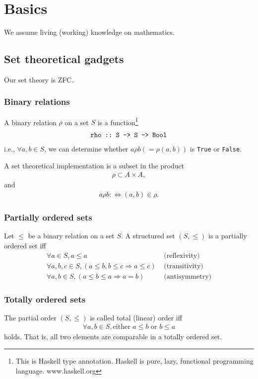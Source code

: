 \documentclass[11pt]{book}
\begin{document}
\chapter{Basics}
We assume living (working) knowledge on mathematics.

\section{Set theoretical gadgets}
Our set theory is ZFC.


\subsection{Binary relations}
A binary relation $\rho$ on a set $S$ is a function\footnote{This is Haskell type annotation. Haskell is pure, lazy, functional programming language. www.haskell.org}
\begin{eqnarray}
\verb|rho :: S -> S -> Bool|
\end{eqnarray}
i.e., $\forall a,b \in S$, we can determine whether $a \rho b \left( = \rho(a,b) \right)$ is \verb|True| or \verb|False|.

A set theoretical implementation is a subset in the product
\begin{eqnarray}
\rho \subset A \times A,
\end{eqnarray}
and
\begin{eqnarray}
a \rho b :\Leftrightarrow (a,b) \in \rho.
\end{eqnarray}

\subsection{Partially ordered sets}
Let $\leq$ be a binary relation on a set $S$.
A structured set $(S, \leq)$ is a partially ordered set iff
\begin{eqnarray}
\forall a \in S, a \leq a & \text{ (reflexivity)} \\
\forall a,b,c \in S, (a \leq b, b \leq c \Rightarrow a \leq c) & \text{ (transitivity)} \\
\forall a,b \in S, (a \leq b \leq a \Rightarrow a = b) & \text{ (antisymmetry)}
\end{eqnarray}

\subsection{Totally ordered sets}
The partial order $(S, \leq)$ is called total (linear) order iff
\begin{eqnarray}
\forall a,b \in S, \text{either } a \leq b \text{ or } b \leq a
\end{eqnarray}
holds.
That is, all two elements are comparable in a totally ordered set.
\end{document}
